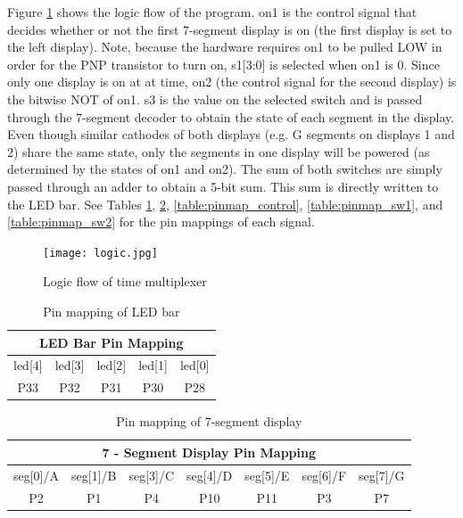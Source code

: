 \documentclass[11pt]{article}
\begin{document}
Figure \ref{fig:logic} shows the logic flow of the program. on1 is the control signal that decides whether or not the first 7-segment display is on (the first display is set to the left display). Note, because the hardware requires on1 to be pulled LOW in order for the PNP transistor to turn on, s1[3:0] is selected when on1 is 0. Since only one display is on at at time, on2 (the control signal for the second display) is the bitwise NOT of on1. s3 is the value on the selected switch and is passed through the 7-segment decoder to obtain the state of each segment in the display. Even though similar cathodes  of both displays (e.g. G segments on displays 1 and 2) share the same state, only the segments in one display will be powered (as determined by the states of on1 and on2). The sum of both switches are simply passed through an adder to obtain a 5-bit sum. This sum is directly written to the LED bar. See Tables \ref{table:pinmap_ledbar}, \ref{table:pinmap_sevenseg}, \ref{table:pinmap_control}, \ref{table:pinmap_sw1}, and \ref{table:pinmap_sw2} for the pin mappings of each signal. \\


\begin{figure}[h!]
\centering
\texttt{[image: logic.jpg]}
\caption{Logic flow of time multiplexer}
\label{fig:logic}
\end{figure} 


\begin{table}[h]
\centering
\begin{tabular}{|c|c|c|c|c|}
\hline
\multicolumn{5}{|c|}{\textbf{LED Bar Pin Mapping}}             \\ \hline
led{[}4{]} & led{[}3{]} & led{[}2{]} & led{[}1{]} & led{[}0{]} \\ \hline
P33        & P32        & P31        & P30        & P28        \\ \hline
\end{tabular}
\caption{Pin mapping of LED bar}
\label{table:pinmap_ledbar}
\end{table}


\begin{table}[h]
\centering
\begin{tabular}{|c|c|c|c|c|c|c|}
\hline
\multicolumn{7}{|c|}{\textbf{7 - Segment Display Pin Mapping}} \\ \hline
seg[0]/A   & seg[1]/B   & seg[3]/C   & seg[4]/D    & seg[5]/E    & seg[6]/F   & seg[7]/G   \\ \hline
P2         & P1         & P4         & P10         & P11         & P3         & P7  \\ \hline
\end{tabular}
\caption{Pin mapping of 7-segment display}
\label{table:pinmap_sevenseg}
\end{table}
\end{document}
